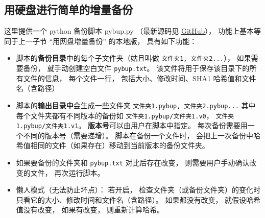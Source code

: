 \subsection{用硬盘进行简单的增量备份}
这里提供一个 python 备份脚本 pybup.py （最新源码见 \href{https://github.com/MacroUniverse/pybup}{GitHub}）， 功能上基本等同于上一子节 “用网盘增量备份” 的本地版， 具有如下功能：
\begin{itemize}
\item 脚本的\textbf{备份目录}中的每个子文件夹（姑且叫做 \verb|文件夹1, 文件夹2...|）， 如果需要备份， 就手动创建空白文件 \verb|pybup.txt|。 该文件将用于保存该目录下的所有文件的信息， 每个文件一行， 包括大小、修改时间、SHA1 哈希值和文件名（含路径）
\item 脚本的\textbf{输出目录中}会生成一些文件夹 \verb|文件夹1.pybup, 文件夹2.pybup...| 其中每个文件夹都有不同版本的备份如 \verb|文件夹1.pybup/文件夹1.v0|， \verb|文件夹1.pybup/文件夹1.v1|。 \textbf{版本号}可以由用户在脚本中指定。 每次备份需要用一个不同的版本号（需要递增）。 脚本在备份一个文件时， 会把上一次备份中哈希值相同的文件（如果存在）移动到当前版本的备份文件夹。
\item 如果要备份的文件夹和 \verb|pybup.txt| 对比后存在改变， 则需要用户手动确认改变的文件， 再次运行脚本。
\item 懒人模式（无法防止坏点）： 若开启， 检查文件夹（或备份文件夹）的变化时只看它的大小、修改时间和文件名（含路径）。 如果都没有改变， 就假设哈希值没有改变， 如果有改变， 则重新计算哈希。
\end{itemize}
